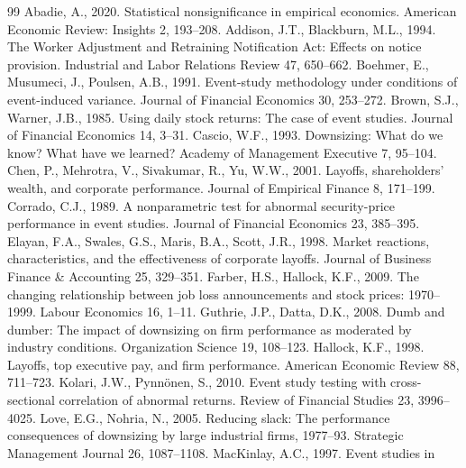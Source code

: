 \documentclass[12pt]{article}
\begin{document}
\begin{thebibliography}{99}
 Abadie, A., 2020. Statistical nonsignificance in
empirical economics. American Economic Review: Insights 2, 193--208.
 Addison, J.T., Blackburn, M.L.,
1994. The Worker Adjustment and Retraining Notification Act: Effects on notice
provision. Industrial and Labor Relations Review 47, 650--662.
 Boehmer, E., Musumeci, J., Poulsen,
A.B., 1991. Event-study methodology under conditions of event-induced variance.
Journal of Financial Economics 30, 253--272.
 Brown, S.J., Warner, J.B., 1985. Using
daily stock returns: The case of event studies. Journal of Financial Economics
14, 3--31.
 Cascio, W.F., 1993. Downsizing: What do we
know? What have we learned? Academy of Management Executive 7, 95--104.
 Chen, P., Mehrotra, V., Sivakumar, R., Yu,
W.W., 2001. Layoffs, shareholders' wealth, and corporate performance. Journal of
Empirical Finance 8, 171--199.
 Corrado, C.J., 1989. A nonparametric test for
abnormal security-price performance in event studies. Journal of Financial
Economics 23, 385--395.
 Elayan, F.A., Swales, G.S., Maris, B.A.,
Scott, J.R., 1998. Market reactions, characteristics, and the effectiveness of
corporate layoffs. Journal of Business Finance \& Accounting 25, 329--351.
 Farber, H.S., Hallock, K.F., 2009.
The changing relationship between job loss announcements and stock prices:
1970--1999. Labour Economics 16, 1--11.
 Guthrie, J.P., Datta, D.K., 2008.
Dumb and dumber: The impact of downsizing on firm performance as moderated by
industry conditions. Organization Science 19, 108--123.
 Hallock, K.F., 1998. Layoffs, top executive
pay, and firm performance. American Economic Review 88, 711--723.
 Kolari, J.W., Pynn\"onen, S.,
2010. Event study testing with cross-sectional correlation of abnormal returns.
Review of Financial Studies 23, 3996--4025.
 Love, E.G., Nohria, N., 2005. Reducing
slack: The performance consequences of downsizing by large industrial firms,
1977--93. Strategic Management Journal 26, 1087--1108.
 MacKinlay, A.C., 1997. Event studies in

\end{thebibliography}
\end{document}
